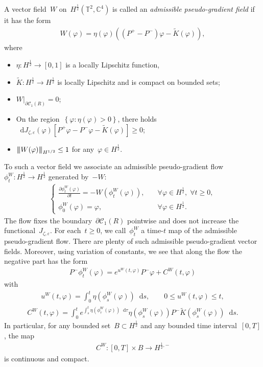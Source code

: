 \documentclass[11pt,final]{amsart}
\newcommand{\tnorm}[1]{%
  \left\vert\kern-0.3ex\left\vert\kern-0.3ex\left\vert #1 \right\vert\kern-0.3ex\right\vert\kern-0.3ex\right\vert
}
\newcommand{\p}{\partial}
\newcommand{\C}{\mathbb{C}}
\newcommand{\dd}{\mathop{}\!\mathrm{d}}
\newcommand{\eps}{\varepsilon}
\newcommand{\parenthesis}[1]{\left(#1\right)} %
\newcommand{\braces}[1]{\left\{#1\right\}} %
\begin{document}
A vector field~$W$ on~$H^{\frac{1}{2}}(\mathbb{T}^2,\C^4)$ is called an \emph{admissible pseudo-gradient field} if it has the form 
\begin{align}
    W(\varphi)= \eta(\varphi) \parenthesis{ (P^+ -P^- )\varphi - \widetilde{K}(\varphi)},
\end{align}
where
\begin{itemize}
    \item[(W1)] $\eta\colon H^{\frac{1}{2}}\to [0,1]$ is a locally Lipschitz function,
    \item[(W2)] $\widetilde{K}\colon H^{\frac{1}{2}}\to H^{\frac{1}{2}}$ is locally Lipschitz and is compact on bounded sets;
    \item[(W3)] $W|_{\p\mathscr{C}_1(R)} = 0$;
    \item[(W4)] On the region~$\braces{\varphi\colon \eta(\varphi)>0}$, there holds~$\dd J_{\zeta,\eps}(\varphi)[P^+\varphi -P^- \varphi -\widetilde{K}(\varphi)]\geq 0$;
    \item[(W5)] $\tnorm{W(\varphi)}_{H^{1/2}} \leq 1$ for any~$\varphi\in H^{\frac{1}{2}}$. 
\end{itemize}
To such a vector field we associate an admissible pseudo-gradient flow~$\phi^W_t\colon H^{\frac{1}{2}}\to H^{\frac{1}{2}}$ generated by~$-W$: 
\begin{align}
    \begin{cases}
        \frac{\p\phi^W_t(\varphi)}{\p t} = - W(\phi^W_t(\varphi)), & \quad \forall \varphi \in H^{\frac{1}{2}}, \; \forall t\geq 0, \\
        \phi^W_0(\varphi)=\varphi, & \quad \forall \varphi\in H^{\frac{1}{2}}.
    \end{cases}
\end{align}
The flow fixes the boundary~$\p\mathscr{C}_1(R)$ pointwise and does not increase the functional~$J_{\zeta,\eps}$.  
For each~$t\geq 0$, we call~$\phi^W_t$ a time-$t$ map of the admissible pseudo-gradient flow. 
There are plenty of such admissible pseudo-gradient vector fields. 
Moreover, using variation of constants, we see that along the flow the negative part has the form
\begin{align}
    P^-\phi^W_t(\varphi)
    = e^{u^W(t,\varphi)}P^-\varphi + C^W(t,\varphi)
\end{align}
with 
\begin{align}
    u^W(t,\varphi)=\int_0^t \eta(\phi^W_s(\varphi))\dd s, \qquad  0\leq u^W(t,\varphi)\leq t ,
\end{align}
\begin{align}
    C^W(t,\varphi)
    = \int_0^t e^{\int_s^t \eta(\phi^W_\tau(\varphi))\dd \tau } \eta(\phi^W_s(\varphi))P^-\widetilde{K}(\phi^W_s(\varphi))\dd{s}. 
\end{align}
In particular, for any bounded set~$B\subset H^{\frac{1}{2}}$ and any bounded time interval~$[0,T]$, the map 
\begin{align}
    C^W\colon [0,T]\times B \to H^{\frac{1}{2},-}
\end{align}
is continuous and compact.
\end{document}
